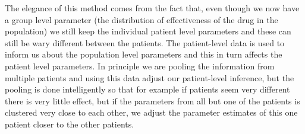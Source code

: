 \documentclass[12pt,a4paper,leqno]{report}
\theoremstyle{plain}
\theoremstyle{definition}
\theoremstyle{remark}
\begin{document}

\bigskip

The elegance of this method comes from the fact that, even though we now have a group
level parameter (the distribution of effectiveness of the drug in the population) we
still keep the individual patient level parameters and these can still be wary different
between the patients. The patient-level data is used to inform us about the population
level parameters and this in turn affects the patient level parameters. In principle we
are pooling the information from multiple patients and using this data adjust our
patient-level inference, but the pooling is done intelligently so that for example if
patients seem very different there is very little effect, but if the parameters from all
but one of the patients is clustered very close to each other, we adjust the parameter
estimates of this one patient closer to the other patients.
\end{document}
